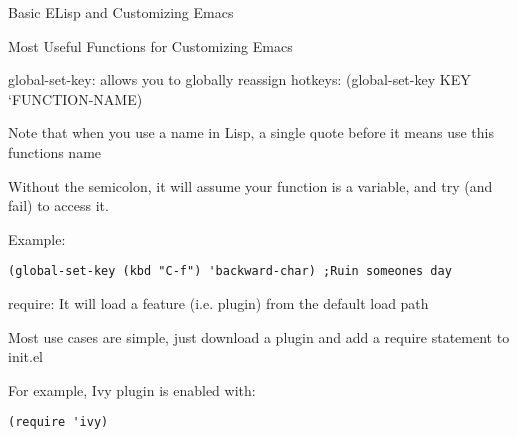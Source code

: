 \documentclass[presentation]{beamer}
\begin{document}
\begin{frame}[fragile,label=sec-5]{Basic ELisp and Customizing Emacs}
\begin{block}{Most Useful Functions for Customizing Emacs}
\begin{block}{global-set-key: allows you to globally reassign hotkeys: (global-set-key KEY `FUNCTION-NAME)}
\begin{block}{Note that when you use a name in Lisp, a single quote before it means use this functions name}
\end{block}
\begin{block}{Without the semicolon, it will assume your function is a variable, and try (and fail) to access it.}
\end{block}
\begin{block}{Example:}
\begin{verbatim}
(global-set-key (kbd "C-f") 'backward-char) ;Ruin someones day
\end{verbatim}
\end{block}
\end{block}
\begin{block}{require: It will load a feature (i.e. plugin) from the default load path}
\begin{block}{Most use cases are simple, just download a plugin and add a require statement to init.el}
\end{block}
\begin{block}{For example, Ivy plugin is enabled with:}
\begin{verbatim}
(require 'ivy)
\end{verbatim}
\end{block}
\end{block}


\end{block}
\end{frame}
\end{document}
